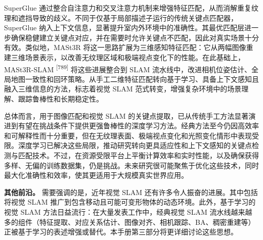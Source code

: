 SuperGlue 通过整合自注意力和交叉注意力机制来增强特征匹配，从而消解重复纹理和遮挡导致的歧义。不同于仅基于局部描述子运行的传统关键点匹配器，SuperGlue 纳入上下文信息，显著提升室内外环境中的准确性。其最优匹配层进一步确保稳健建立关键点对应，并在需要时允许关键点不匹配，因此对真实场景十分有效。类似地，MASt3R 将这一思路扩展为三维感知特征匹配：它从两幅图像重建三维场景表示，以改善无纹理区域和极端视点变化下的性能。在此基础上，MASt3R-SLAM \textsuperscript{[789]} 将这些进展整合到 SLAM 流水线中，改进相机位姿估计、全局地图一致性和回环策略。从手工二维特征匹配转向基于学习、具备上下文感知且融入三维信息的方法，标志着视觉 SLAM 范式转变，增强复杂环境中的场景理解、跟踪鲁棒性和长期稳定性。

总体而言，用于图像匹配和视觉 SLAM 的关键点提取，已从传统手工方法显著演进到有望在挑战条件下提供更强鲁棒性的深度学习方法。经典方法至今仍因高效率和可解释性而十分重要，但在无纹理表面、极端视点变化和光照变化情形中表现受限。深度学习已解决这些局限，推动研究转向更具适应性和上下文感知的关键点检测与匹配技术。不过，在资源受限平台上平衡计算效率和实时性能，以及确保获得多样、无偏的训练数据集，仍是挑战。未来研究很可能聚焦于优化这些技术，同时最大化准确性和效率，使其更适用于大规模真实世界应用。

\textbf{其他前沿。} 需要强调的是，近年视觉 SLAM 还有许多令人振奋的进展。其中包括将视觉 SLAM 推广到包含移动且可能可变形物体的动态环境。此外，基于学习的视觉 SLAM 方法日益流行：在大量发表工作中，经典视觉 SLAM 流水线越来越多的组件（特征提取、对应关系估计、图像对齐、相机跟踪、BA、稠密重建等）正被基于学习的表述增强或替代。本手册第三部分将更详细讨论这些思想。
